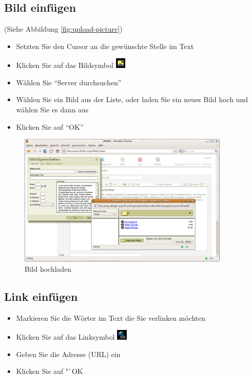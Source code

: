 \documentclass[article, a4paper, oneside, 11pt]{memoir}
\begin{document}
\subsection{Bild einfügen}
(Siehe Abbildung \vref{fig:upload-picture})
\begin{itemize}
\item Setzten Sie den Cursor an die gewünschte Stelle im Text
\item Klicken Sie auf das Bildsymbol \includegraphics[width=5mm, height=5mm]{picture-symbol.png}
\item Wählen Sie "`Server durchsuchen"'
\item Wählen Sie ein Bild aus der Liste, oder laden Sie ein neues Bild hoch und wählen Sie es dann aus
\item Klicken Sie auf "`OK"'
\end{itemize}

\begin{figure}[htp]
\centering
\includegraphics[width=0.9\textwidth]{upload-picture}
\caption{Bild hochladen}
\label{fig:upload-picture}
\end{figure}


\subsection{Link einfügen}
\begin{itemize}
\item Markieren Sie die Wörter im Text die Sie verlinken möchten
\item Klicken Sie auf das Linksymbol \includegraphics[width=5mm, height=5mm]{link-symbol.png}
\item Geben Sie die Adresse (URL) ein
\item Klicken Sie auf "`OK
\end{itemize}
\end{document}
